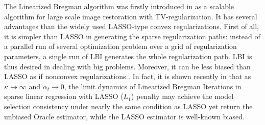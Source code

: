 \documentclass[10pt,journal,cspaper,compsoc]{IEEEtran}
\begin{document}
{The Linearized Bregman algorithm was firstly introduced in \cite{OBG+05} as a scalable algorithm for large scale image restoration with TV-regularization. It has several advantages than the widely used LASSO-type convex regularizations. First of all, it is simpler than LASSO in generating the sparse regularization paths: instead of a parallel run of several optimization problem over a grid of regularization parameters, a single run of LBI generates the whole regularization path. LBI is thus desired in dealing with big problems. Moreover, it can be less biased than LASSO as if nonconvex regularizations \cite{FanLi01}. In fact, it is shown recently in \cite{osher2014} that as $\kappa\to \infty$ and $\alpha_t\to 0$, the limit dynamics of Linearized Bregman Iterations in sparse linear regression with LASSO ($L_1$) penalty may achieve the model selection consistency under nearly the same condition as LASSO yet return the unbiased Oracle estimator, while the LASSO estimator is well-known biased.



}
\end{document}
